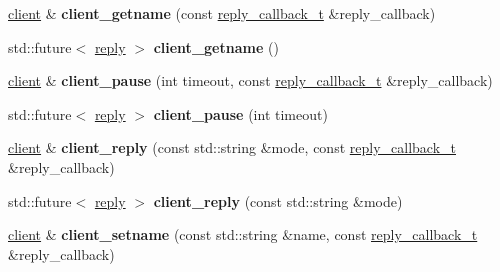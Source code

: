 \begin{DoxyCompactItemize}
\hyperlink{classcpp__redis_1_1client}{client} \& {\bfseries client\+\_\+getname} (const \hyperlink{classcpp__redis_1_1client_a061a1140d36d2eaeda82b09a0bb3f9f2}{reply\+\_\+callback\+\_\+t} \&reply\+\_\+callback)
\item 
\mbox{\label{classcpp__redis_1_1client_a89068e68b418906e9e34cb9a95f7a179}} 
std\+::future$<$ \hyperlink{classcpp__redis_1_1reply}{reply} $>$ {\bfseries client\+\_\+getname} ()
\item 
\mbox{\label{classcpp__redis_1_1client_acdf001d60d1d82d3f090b7c679e3183e}} 
\hyperlink{classcpp__redis_1_1client}{client} \& {\bfseries client\+\_\+pause} (int timeout, const \hyperlink{classcpp__redis_1_1client_a061a1140d36d2eaeda82b09a0bb3f9f2}{reply\+\_\+callback\+\_\+t} \&reply\+\_\+callback)
\item 
\mbox{\label{classcpp__redis_1_1client_a2c73a6f9b2e3f1a0afbaca9fddd29199}} 
std\+::future$<$ \hyperlink{classcpp__redis_1_1reply}{reply} $>$ {\bfseries client\+\_\+pause} (int timeout)
\item 
\mbox{\label{classcpp__redis_1_1client_a5e49e9bf9bb72659b33013fac751a712}} 
\hyperlink{classcpp__redis_1_1client}{client} \& {\bfseries client\+\_\+reply} (const std\+::string \&mode, const \hyperlink{classcpp__redis_1_1client_a061a1140d36d2eaeda82b09a0bb3f9f2}{reply\+\_\+callback\+\_\+t} \&reply\+\_\+callback)
\item 
\mbox{\label{classcpp__redis_1_1client_a1b378de0c1805069b9bbecd4fca4091c}} 
std\+::future$<$ \hyperlink{classcpp__redis_1_1reply}{reply} $>$ {\bfseries client\+\_\+reply} (const std\+::string \&mode)
\item 
\mbox{\label{classcpp__redis_1_1client_a5c7f977196c1c00e3c732615c0d86ae7}} 
\hyperlink{classcpp__redis_1_1client}{client} \& {\bfseries client\+\_\+setname} (const std\+::string \&name, const \hyperlink{classcpp__redis_1_1client_a061a1140d36d2eaeda82b09a0bb3f9f2}{reply\+\_\+callback\+\_\+t} \&reply\+\_\+callback)
\item 
\mbox{\label{classcpp__redis_1_1client_aa1ab41fda6b2536f652720b7720a0b63}} 

\end{DoxyCompactItemize}
